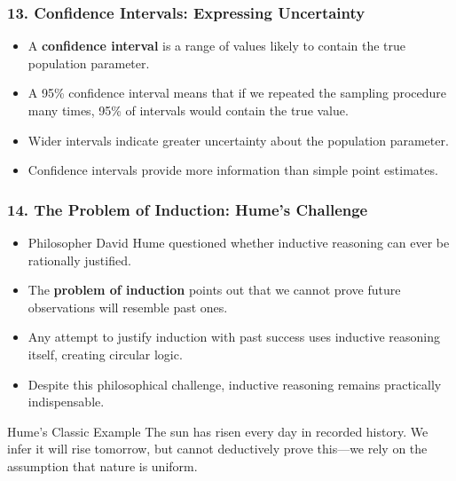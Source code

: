 \documentclass{beamer}
\begin{document}
\begin{frame}
\frametitle{13. Confidence Intervals: Expressing Uncertainty}
\begin{itemize}
\item A \textbf{confidence interval} is a range of values likely to contain the true population parameter.
\item A 95\% confidence interval means that if we repeated the sampling procedure many times, 95\% of intervals would contain the true value.
\item Wider intervals indicate greater uncertainty about the population parameter.
\item Confidence intervals provide more information than simple point estimates.
\end{itemize}

\begin{center}
\end{center}
\end{frame}

\begin{frame}
\frametitle{14. The Problem of Induction: Hume's Challenge}
\begin{itemize}
\item Philosopher David Hume questioned whether inductive reasoning can ever be rationally justified.
\item The \textbf{problem of induction} points out that we cannot prove future observations will resemble past ones.
\item Any attempt to justify induction with past success uses inductive reasoning itself, creating circular logic.
\item Despite this philosophical challenge, inductive reasoning remains practically indispensable.
\end{itemize}

\begin{block}{Hume's Classic Example}
The sun has risen every day in recorded history. We infer it will rise tomorrow, but cannot deductively prove this—we rely on the assumption that nature is uniform.
\end{block}
\end{frame}
\end{document}
